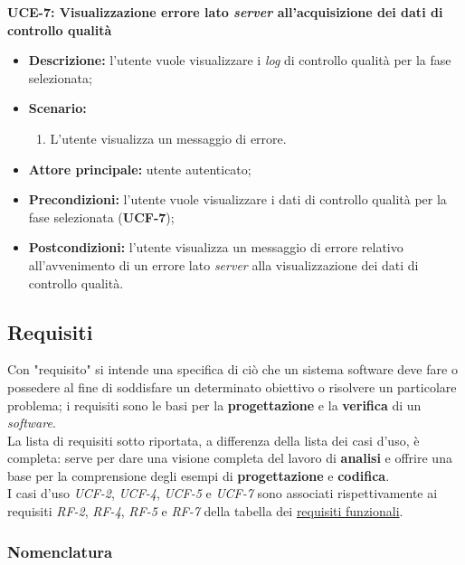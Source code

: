         \textbf{UCE-7: Visualizzazione errore lato \textit{server} all’acquisizione dei dati di controllo qualità}
        \begin{itemize}
            \item \textbf{Descrizione:} l’utente vuole visualizzare i \textit{log} di controllo qualità per la fase selezionata;
            \item \textbf{Scenario:}
                \begin{enumerate}
                    \item L’utente visualizza un messaggio di errore.
                \end{enumerate}
            \item \textbf{Attore principale:} utente autenticato;
            \item \textbf{Precondizioni:} l’utente vuole visualizzare i dati di controllo qualità per la fase selezionata (\textbf{UCF-7});
            \item \textbf{Postcondizioni:} l’utente visualizza un messaggio di errore relativo all’avvenimento di un errore lato \textit{server} alla visualizzazione dei dati di controllo qualità.
        \end{itemize}

\subsection{Requisiti}
\label{subsec:requisiti}

Con "requisito" si intende una specifica di ciò che un sistema software deve fare o possedere al fine di soddisfare un determinato obiettivo o risolvere un particolare problema; i requisiti sono le basi per la \textbf{progettazione} e la \textbf{verifica} di un \textit{software}. \\
La lista di requisiti sotto riportata, a differenza della lista dei casi d'uso, è completa: serve per dare una visione completa del lavoro di \textbf{analisi} e offrire una base per la comprensione degli esempi di \textbf{progettazione} e \textbf{codifica}. \\
I casi d'uso \textit{UCF-2}, \textit{UCF-4}, \textit{UCF-5} e \textit{UCF-7} sono associati rispettivamente ai requisiti \textit{RF-2}, \textit{RF-4}, \textit{RF-5} e \textit{RF-7} della tabella dei \hyperref[tab:requisiti-funzionali]{requisiti funzionali}.
\subsubsection*{Nomenclatura}


